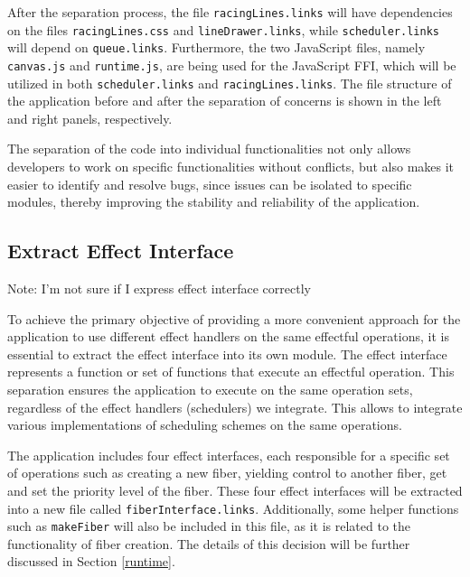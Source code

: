 \documentclass[logo,bsc,singlespacing,parskip]{infthesis}
\begin{document}
After the separation process, the file \texttt{racingLines.links} will have dependencies on the files \texttt{racingLines.css} and \texttt{lineDrawer.links}, while \texttt{scheduler.links} will depend on \texttt{queue.links}. Furthermore, the two JavaScript files, namely \texttt{canvas.js} and \texttt{runtime.js}, are being used for the JavaScript FFI, which will be utilized in both \texttt{scheduler.links} and \texttt{racingLines.links}. The file structure of the application before and after the separation of concerns is shown in the left and right panels, respectively.


\begin{multicols}{2}
\columnbreak
{}
\end{multicols}

The separation of the code into individual functionalities not only allows developers to work on specific functionalities without conflicts, but also makes it easier to identify and resolve bugs, since issues can be isolated to specific modules, thereby improving the stability and reliability of the application.

\subsection{Extract Effect Interface}
\label{eei}
Note: I'm not sure if I express effect interface correctly

To achieve the primary objective of providing a more convenient approach for the application to use different effect handlers on the same effectful operations, it is essential to extract the effect interface into its own module.  The effect interface represents a function or set of functions that execute an effectful operation. This separation ensures the application to execute on the same operation sets, regardless of the effect handlers (schedulers) we integrate. This allows to integrate various implementations of scheduling schemes on the same operations.

The application includes four effect interfaces, each responsible for a specific set of operations such as creating a new fiber, yielding control to another fiber, get and set the priority level of the fiber. These four effect interfaces will be extracted into a new file called \texttt{fiberInterface.links}. Additionally, some helper functions such as \texttt{makeFiber} will also be included in this file, as it is related to the functionality of fiber creation. The details of this decision will be further discussed in Section \ref{runtime}.
\end{document}
